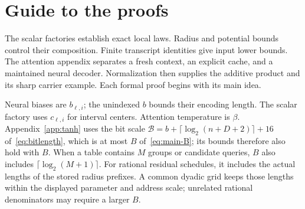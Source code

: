 \section*{Guide to the proofs}

The scalar factories establish exact local laws. Radius and potential
bounds control their composition. Finite transcript identities give
input lower bounds. The attention appendix separates a fresh context,
an explicit cache, and a maintained neural decoder. Normalization
then supplies the additive product and its sharp carrier example.
Each formal proof begins with its main idea.

Neural biases are $b_{\ell,i}$; the unindexed $b$ bounds their
encoding length. The scalar factory uses $c_{\ell,i}$ for interval
centers. Attention temperature is $\beta$. Appendix~\ref{app:tanh}
uses the bit scale
$\mathcal B=b+\lceil\log_2(n+D+2)\rceil+16$ of~\eqref{eq:bitlength},
which is at most $B$ of~\eqref{eq:main-B}; its bounds therefore also
hold with $B$.
When a table contains $M$ groups or candidate queries, $B$ also
includes $\lceil\log_2(M+1)\rceil$. For rational residual schedules,
it includes the actual lengths of the stored radius prefixes.
A common dyadic grid keeps those lengths within the displayed
parameter and address scale; unrelated rational denominators
may require a larger $B$.

